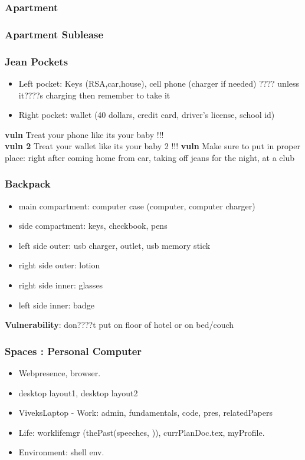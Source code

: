 \begin{frame}
\frametitle{Apartment} 
 \end{frame} 

\begin{frame} 
\frametitle{Apartment Sublease} 

\end{frame} 

\begin{frame}
\frametitle{Jean Pockets}
\begin{itemize}
\tiny \item \tiny Left pocket: Keys (RSA,car,house), cell phone (charger if
  needed) ???? unless it????s charging then remember to take it
 \item \tiny Right pocket: wallet (40 dollars, credit card, driver's
   license, school id)
\end{itemize} 
{\bf vuln} Treat your phone like its your baby !!! \\
{\bf vuln 2} Treat your wallet like its your baby 2 !!! 
{\bf vuln} Make sure to put in proper place:  right after coming
home from car, taking off jeans for the night, at a club 
\end{frame} 

\begin{frame}[label=backpack]
\frametitle{Backpack} 
\begin{itemize} 
\tiny \item \tiny main compartment: computer case (computer, computer charger)
\item \tiny side compartment: keys, checkbook, pens
\item \tiny left side outer: usb charger, outlet, usb memory stick 
\item \tiny right side outer: lotion
\item \tiny right side inner: glasses
\item \tiny left side inner: badge 
\end{itemize} 
\textbf{Vulnerability}: don????t put on floor of hotel or on bed/couch \\
\end{frame}

\begin{frame}[label=comp]
\frametitle{Spaces : Personal Computer}
\begin{itemize}
\tiny \item \tiny Webpresence, browser.
\tiny \item \tiny desktop layout1, desktop layout2
\item \tiny ViveksLaptop - Work: admin, fundamentals, code, pres, relatedPapers
\item \tiny Life: worklifemgr (thePast(speeches,   )),
  currPlanDoc.tex, myProfile. 
\item \tiny Environment: shell env. 
\end{itemize} 
\end{frame}

